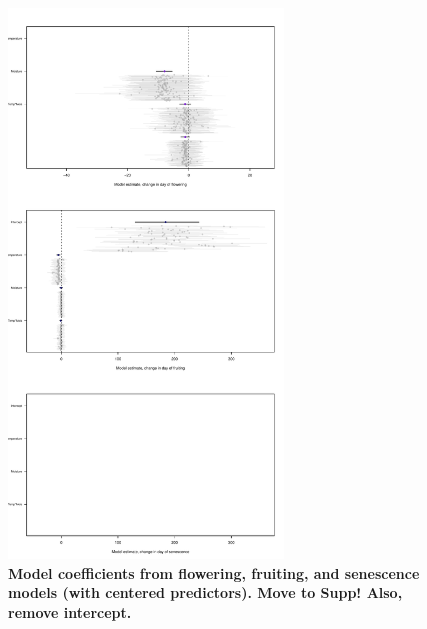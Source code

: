 \documentclass{article}
\begin{document}
\begin{figure}[h]
\centering
 \includegraphics[width=0.65\textwidth]{../../Analyses/soilmoisture/figures/m5_ffd_frd_sen.pdf}
 \caption{\textbf{Model coefficients from flowering, fruiting, and senescence models (with centered predictors). Move to Supp! Also, remove intercept.}} 
 \label{fig:flfr}
 \end{figure}
 
\end{document}
